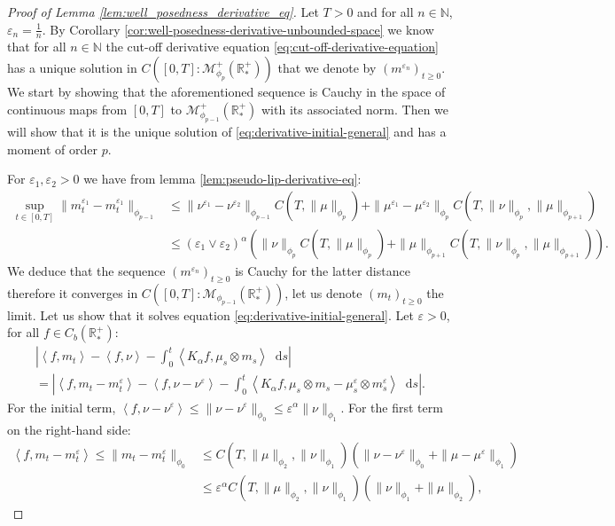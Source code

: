 \documentclass[11pt,a4paper]{article}
\newcommand{\NN}{\mathbb{N}}
\newcommand{\RRP}{\mathbb{R}^+_*}
\newcommand{\MC}{\mathcal{M}}
\newcommand{\Proc}[1]{\left(#1\right)_{t\geq 0}}
\newcommand{\brac}[1]{\left\langle#1\right\rangle}
\newcommand{\dd}{\mathop{}\!\mathrm{d}}
\begin{document}
\begin{proof}[Proof of Lemma \ref{lem:well_posedness_derivative_eq}]
    Let $T > 0$ and for all $n\in \NN$, $\varepsilon_n = \frac1n$. By Corollary \ref{cor:well-posedness-derivative-unbounded-space} we know that for all $n \in \NN$ the cut-off derivative equation \eqref{eq:cut-off-derivative-equation} has a unique solution in $C\left([0,T]: \MC_{\phi_{p}}^+ (\RRP)\right)$ that we denote by $\Proc{m^{\varepsilon_n}}$. We start by showing that the aforementioned sequence is Cauchy in the space of continuous maps from $[0,T]$ to $\MC_{\phi_{p-1}}^+ (\RRP)$ with its associated norm. Then we will show that it is the unique solution of \eqref{eq:derivative-initial-general} and has a moment of order $p$.
    
    For $\varepsilon_1, \varepsilon_2 > 0$ we have from lemma \ref{lem:pseudo-lip-derivative-eq}:
    \begin{align*}
        \sup\limits_{t\in [0,T]} \| m^{\varepsilon_1}_t - m^{\varepsilon_1}_t\|_{\phi_{p-1}} 
        &\leq \|\nu^{\varepsilon_1} - \nu^{\varepsilon_2}\|_{\phi_{p-1}} C(T,\|\mu\|_{\phi_{p}}) + \|\mu^{\varepsilon_1} - \mu^{\varepsilon_2}\|_{\phi_{p}}C(T,\|\nu\|_{\phi_p},\|\mu\|_{\phi_{p+1}}) \\
        &\leq \left(\varepsilon_1 \vee \varepsilon_2\right)^{\alpha} \left(\|\nu\|_{\phi_{p}} C(T,\|\mu\|_{\phi_{p}}) + \|\mu\|_{\phi_{p+1}}C(T,\|\nu\|_{\phi_p},\|\mu\|_{\phi_{p+1}})\right).
    \end{align*}
    We deduce that the sequence $\Proc{m^{\varepsilon_n}}$ is Cauchy for the latter distance therefore it converges in $C\left([0,T]:\MC_{\phi_{p-1}}(\RRP)\right)$, let us denote $\Proc{m_t}$ the limit. Let us show that it solves equation \eqref{eq:derivative-initial-general}. Let $\varepsilon > 0$, for all $f \in C_b(\RRP)$:
    \begin{multline*}
        \left| \brac{f,m_t} - \brac{f,\nu} - \int_0^t \brac{K_\alpha f,\mu_s \otimes m_s} \dd s\right|\\
        = \left| \brac{f,m_t- m^\varepsilon_t} - \brac{f,\nu - \nu^\varepsilon} - \int_0^t \brac{K_\alpha f,\mu_s \otimes m_s - \mu^\varepsilon_s \otimes m^\varepsilon_s} \dd s\right|.
    \end{multline*}
    For the initial term, $\brac{f,\nu - \nu^\varepsilon} \leq \|\nu - \nu^\varepsilon\|_{\phi_0} \leq \varepsilon^\alpha\|\nu\|_{\phi_1}$. For the first term on the right-hand side:
    \begin{align*}
        \brac{f,m_t- m^\varepsilon_t}\leq \|m_t - m_t^\varepsilon\|_{\phi_0} &\leq C(T,\|\mu\|_{\phi_2},\|\nu\|_{\phi_1}) \left(\|\nu- \nu^\varepsilon\|_{\phi_0} + \|\mu- \mu^\varepsilon\|_{\phi_1}\right)\\ &\leq \varepsilon^\alpha C(T,\|\mu\|_{\phi_2},\|\nu\|_{\phi_1}) \left(\|\nu\|_{\phi_1} + \|\mu\|_{\phi_2}\right),

\end{align*}
\end{proof}
\end{document}
